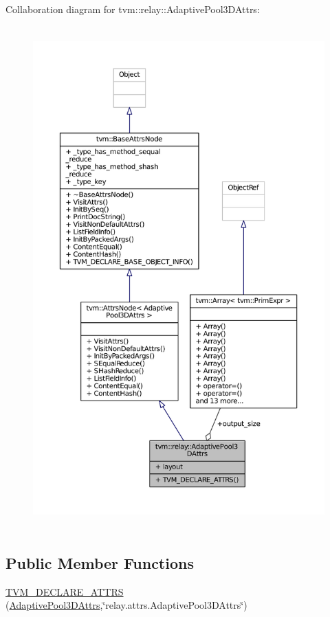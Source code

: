 Collaboration diagram for tvm\+:\+:relay\+:\+:Adaptive\+Pool3\+D\+Attrs\+:
\nopagebreak
\begin{figure}[H]
\begin{center}
\leavevmode
\includegraphics[height=550pt]{structtvm_1_1relay_1_1AdaptivePool3DAttrs__coll__graph}
\end{center}
\end{figure}
\subsection*{Public Member Functions}
\begin{DoxyCompactItemize}
\item 
\hyperlink{structtvm_1_1relay_1_1AdaptivePool3DAttrs_a51be0f4ac6d7df200afe4539b6611b76}{T\+V\+M\+\_\+\+D\+E\+C\+L\+A\+R\+E\+\_\+\+A\+T\+T\+RS} (\hyperlink{structtvm_1_1relay_1_1AdaptivePool3DAttrs}{Adaptive\+Pool3\+D\+Attrs},\char`\"{}relay.\+attrs.\+Adaptive\+Pool3\+D\+Attrs\char`\"{})
\end{DoxyCompactItemize}
